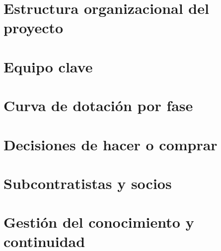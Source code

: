 
\begin{resumenApertura}
\begin{recibe}
  \item {}
\end{recibe}
\end{resumenApertura}

\section{Estructura organizacional del proyecto}\label{sec:12-estructura-organizacional-del-pr}


\section{Equipo clave}\label{sec:12-equipo-clave}


\section{Curva de dotación por fase}\label{sec:12-curva-de-dotacion-por-fase}


\section{Decisiones de hacer o comprar}\label{sec:12-decisiones-de-hacer-o-comprar}


\section{Subcontratistas y socios}\label{sec:12-subcontratistas-y-socios}


\section{Gestión del conocimiento y continuidad}\label{sec:12-gestion-del-conocimiento-y-conti}

